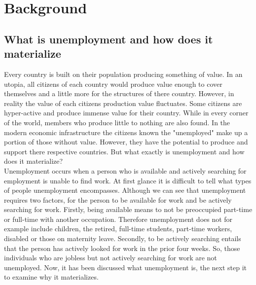 \section{Background}\label{ch:background}

\subsection{What is unemployment and how does it materialize}
Every country is built on their population producing something of value. 
In an utopia, all citizens of each country would produce value enough to cover themselves and a little more for the structures of there country.
However, in reality the value of each citizens production value fluctuates. 
Some citizens are hyper-active and produce immense value for their country.
While in every corner of the world, members who produce little to nothing are also found. 
In the modern economic infrastructure the citizens known the "unemployed" make up a portion of those without value.
However, they have the potential to produce and support there respective countries.
But what exactly is unemployment and how does it materialize? \\

Unemployment occurs when a person who is available and actively searching for employment is unable to find work. \cite{Guide_to_unemployment} 
At first glance it is difficult to tell what types of people unemployment encompasses.
Although we can see that unemployment requires two factors, for the person to be available for work and be actively searching for work.
Firstly, being available means to not be preoccupied part-time or full-time with another occupation.
Therefore unemployment does not for example include children, the retired, full-time students, part-time workers, disabled or those on maternity leave.
Secondly, to be actively searching entails that the person has actively looked for work in the prior four weeks. \cite{US_unemployment_statistics_definition} 
So, those individuals who are jobless but not actively searching for work are not unemployed.
Now, it has been discussed what unemployment is, the next step it to examine why it materializes. \\

